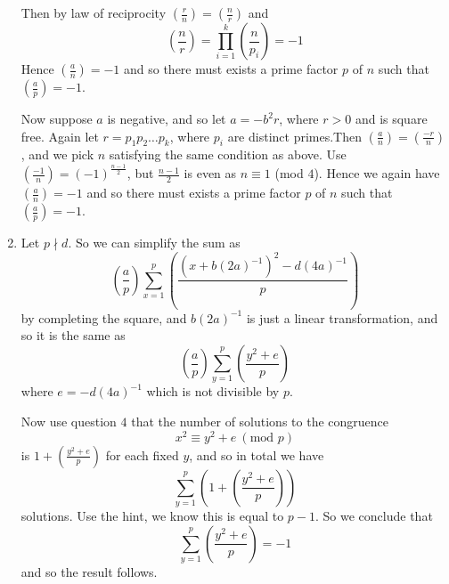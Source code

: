 \begin{enumerate}
    Then by law of reciprocity  $(\frac{r}{n})=(\frac{n}{r})$ and
    $$\left(\frac{n}{r}\right)=\prod_{i=1}^{k}\left(\frac{n}{p_i}\right)=-1$$
    Hence $(\frac{a}{n})=-1$ and so there must exists a prime factor $p$ of $n$ such that
    $(\frac{a}{p})=-1$.

    Now suppose $a$ is negative, and so let $a=-b^2 r$, where $r>0$ and is square free. Again let
    $r=p_1 p_2 \ldots p_k$, where $p_i$ are distinct primes.Then $(\frac{a}{n})=(\frac{-r}{n})$, and we pick $n$ satisfying the same condition as above. Use $(\frac{-1}{n})=(-1)^{\frac{n-1}{2}}$, but $\frac{n-1}{2}$ is even as $n \equiv 1$ (mod $4$). Hence we again have $(\frac{a}{n})=-1$ and so there must exists a prime factor $p$ of $n$ such that $(\frac{a}{p})=-1$.
\item Let $p \nmid d$. So we can simplify the sum as
    $$\left(\frac{a}{p}\right)\sum_{x=1}^{p}\left(\frac{(x+b(2a)^{-1})^2-d(4a)^{-1}}{p}\right)$$
    by completing the square, and $b(2a)^{-1}$ is just a linear transformation, and so it is the same as
    $$\left(\frac{a}{p}\right)\sum_{y=1}^{p}\left(\frac{y^2+e}{p}\right)$$
    where $e=-d(4a)^{-1}$ which is not divisible by $p$.

    Now use question $4$ that the number of solutions to the congruence
    $$x^2 \equiv y^2+e~(\text{mod } p)$$
    is $1+(\frac{y^2+e}{p})$ for each fixed $y$, and so in total we have
    $$\sum_{y=1}^{p} \left(1+\left(\frac{y^2+e}{p}\right)\right)$$
    solutions. Use the hint, we know this is equal to $p-1$. So we conclude that
    $$\sum_{y=1}^{p} \left(\frac{y^2+e}{p}\right)=-1$$
    and so the result follows.


\end{enumerate}
